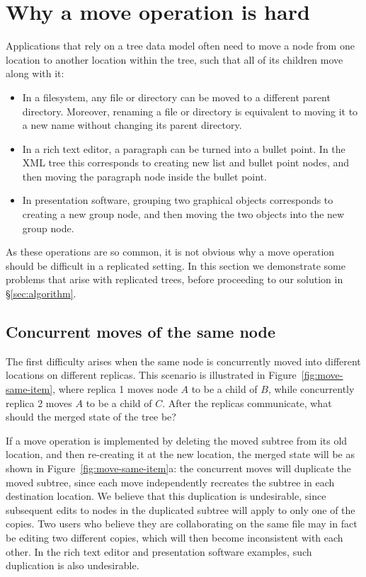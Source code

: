 \documentclass[sigplan,anonymous]{acmart}
\begin{document}
\section{Why a move operation is hard}\label{sec:move-is-hard}

Applications that rely on a tree data model often need to move a node from one location to another location within the tree, such that all of its children move along with it:
\begin{itemize}
    \item In a filesystem, any file or directory can be moved to a different parent directory.
        Moreover, renaming a file or directory is equivalent to moving it to a new name without changing its parent directory.
    \item In a rich text editor, a paragraph can be turned into a bullet point.
        In the XML tree this corresponds to creating new list and bullet point nodes, and then moving the paragraph node inside the bullet point.
    \item In presentation software, grouping two graphical objects corresponds to creating a new group node, and then moving the two objects into the new group node.
\end{itemize}
As these operations are so common, it is not obvious why a move operation should be difficult in a replicated setting.
In this section we demonstrate some problems that arise with replicated trees, before proceeding to our solution in \S\ref{sec:algorithm}.

\subsection{Concurrent moves of the same node}\label{sec:move-same-item}

The first difficulty arises when the same node is concurrently moved into different locations on different replicas.
This scenario is illustrated in Figure~\ref{fig:move-same-item}, where replica 1 moves node $A$ to be a child of $B$, while concurrently replica 2 moves $A$ to be a child of $C$.
After the replicas communicate, what should the merged state of the tree be?

If a move operation is implemented by deleting the moved subtree from its old location, and then re-creating it at the new location, the merged state will be as shown in Figure~\ref{fig:move-same-item}a: the concurrent moves will duplicate the moved subtree, since each move independently recreates the subtree in each destination location.
We believe that this duplication is undesirable, since subsequent edits to nodes in the duplicated subtree will apply to only one of the copies.
Two users who believe they are collaborating on the same file may in fact be editing two different copies, which will then become inconsistent with each other.
In the rich text editor and presentation software examples, such duplication is also undesirable.
\end{document}
